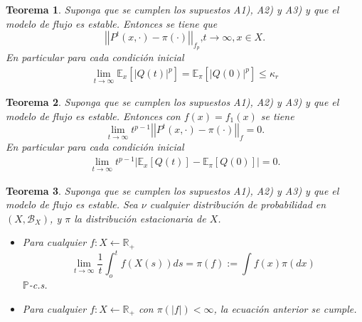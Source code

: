 \documentclass{article}
\newtheorem{Teo}{Teorema}[section]
\newcommand{\rea}{\mathbb{R}}
\newcommand{\esp}{\mathbb{E}}
\newcommand{\prob}{\mathbb{P}}
\numberwithin{equation}{section}
\begin{document}
\begin{Teo}\label{Tma.6.2}
Suponga que se cumplen los supuestos A1), A2) y A3) y que el
modelo de flujo es estable. Entonces se tiene que
\begin{equation}
|\left|P^{t}\left(x,\cdot\right)-\pi\left(\cdot\right)\right||_{f_{p}}\textrm{,
}t\rightarrow\infty,x\in X.
\end{equation}
En particular para cada condici\'on inicial
\begin{eqnarray*}
\lim_{t\rightarrow\infty}\esp_{x}\left[|Q\left(t\right)|^{p}\right]=\esp_{\pi}\left[|Q\left(0\right)|^{p}\right]\leq\kappa_{r}
\end{eqnarray*}
\end{Teo}
\begin{Teo}\label{Tma.6.3}
Suponga que se cumplen los supuestos A1), A2) y A3) y que el
modelo de flujo es estable. Entonces con
$f\left(x\right)=f_{1}\left(x\right)$ se tiene
\begin{equation}
\lim_{t\rightarrow\infty}t^{p-1}|\left|P^{t}\left(x,\cdot\right)-\pi\left(\cdot\right)\right||_{f}=0.
\end{equation}
En particular para cada condici\'on inicial
\begin{eqnarray*}
\lim_{t\rightarrow\infty}t^{p-1}|\esp_{x}\left[Q\left(t\right)\right]-\esp_{\pi}\left[Q\left(0\right)\right]|=0.
\end{eqnarray*}
\end{Teo}

\begin{Teo}\label{Tma.6.4}
Suponga que se cumplen los supuestos A1), A2) y A3) y que el
modelo de flujo es estable. Sea $\nu$ cualquier distribuci\'on de
probabilidad en $\left(X,\mathcal{B}_{X}\right)$, y $\pi$ la
distribuci\'on estacionaria de $X$.
\begin{itemize}
\item[i)] Para cualquier $f:X\leftarrow\rea_{+}$
\begin{equation}
\lim_{t\rightarrow\infty}\frac{1}{t}\int_{o}^{t}f\left(X\left(s\right)\right)ds=\pi\left(f\right):=\int
f\left(x\right)\pi\left(dx\right)
\end{equation}
$\prob$-c.s. \item[ii)] Para cualquier $f:X\leftarrow\rea_{+}$ con
$\pi\left(|f|\right)<\infty$, la ecuaci\'on anterior se cumple.
\end{itemize}
\end{Teo}
\end{document}
